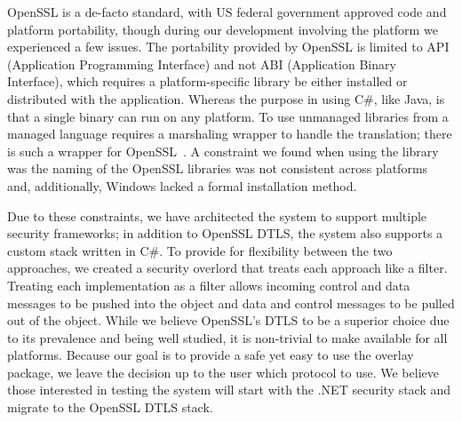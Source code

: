 \documentclass[conference]{IEEEtran}
\begin{document}
OpenSSL is a de-facto standard, with US federal government approved code and 
platform portability, though during our development involving the platform we
experienced a few
issues.  The portability provided by OpenSSL is limited to API (Application
Programming Interface) and not ABI (Application Binary Interface), which
requires a platform-specific library be either installed or distributed with
the application.  Whereas the purpose in using C\#, like Java, is that a single
binary can run on any platform.  To use unmanaged libraries from a managed
language requires a marshaling wrapper to handle the translation; there is
such a wrapper for OpenSSL~\cite{openssl.net}.  A constraint we found when
using the library was the naming of the OpenSSL libraries was not consistent
across platforms and, additionally, Windows lacked a formal installation method.

Due to these constraints, we have architected the system to
support multiple security frameworks; in addition to OpenSSL DTLS, the system
also supports a custom stack written in C\#.  To provide for
flexibility between the two approaches, we created a security overlord that
treats each approach like a filter.  Treating each implementation as a filter
allows incoming control and data messages to be pushed into the object and data
and control messages to be pulled out of the object.  While we believe OpenSSL's
DTLS to be a superior choice due to its prevalence and being well studied, it is
non-trivial to make available for all platforms.  Because our goal is to provide
a safe yet easy to use the overlay package, we leave the decision up to the user
which protocol to use.  We believe those interested in testing the system will
start with the .NET security stack and migrate to the OpenSSL DTLS stack.



\end{document}
